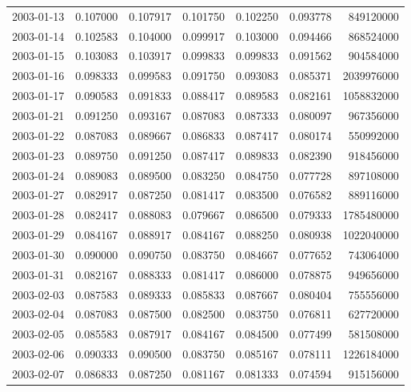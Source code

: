 \begin{tabular}{lrrrrrr}
2003-01-13 &    0.107000 &    0.107917 &    0.101750 &    0.102250 &    0.093778 &   849120000 \\
2003-01-14 &    0.102583 &    0.104000 &    0.099917 &    0.103000 &    0.094466 &   868524000 \\
2003-01-15 &    0.103083 &    0.103917 &    0.099833 &    0.099833 &    0.091562 &   904584000 \\
2003-01-16 &    0.098333 &    0.099583 &    0.091750 &    0.093083 &    0.085371 &  2039976000 \\
2003-01-17 &    0.090583 &    0.091833 &    0.088417 &    0.089583 &    0.082161 &  1058832000 \\
2003-01-21 &    0.091250 &    0.093167 &    0.087083 &    0.087333 &    0.080097 &   967356000 \\
2003-01-22 &    0.087083 &    0.089667 &    0.086833 &    0.087417 &    0.080174 &   550992000 \\
2003-01-23 &    0.089750 &    0.091250 &    0.087417 &    0.089833 &    0.082390 &   918456000 \\
2003-01-24 &    0.089083 &    0.089500 &    0.083250 &    0.084750 &    0.077728 &   897108000 \\
2003-01-27 &    0.082917 &    0.087250 &    0.081417 &    0.083500 &    0.076582 &   889116000 \\
2003-01-28 &    0.082417 &    0.088083 &    0.079667 &    0.086500 &    0.079333 &  1785480000 \\
2003-01-29 &    0.084167 &    0.088917 &    0.084167 &    0.088250 &    0.080938 &  1022040000 \\
2003-01-30 &    0.090000 &    0.090750 &    0.083750 &    0.084667 &    0.077652 &   743064000 \\
2003-01-31 &    0.082167 &    0.088333 &    0.081417 &    0.086000 &    0.078875 &   949656000 \\
2003-02-03 &    0.087583 &    0.089333 &    0.085833 &    0.087667 &    0.080404 &   755556000 \\
2003-02-04 &    0.087083 &    0.087500 &    0.082500 &    0.083750 &    0.076811 &   627720000 \\
2003-02-05 &    0.085583 &    0.087917 &    0.084167 &    0.084500 &    0.077499 &   581508000 \\
2003-02-06 &    0.090333 &    0.090500 &    0.083750 &    0.085167 &    0.078111 &  1226184000 \\
2003-02-07 &    0.086833 &    0.087250 &    0.081167 &    0.081333 &    0.074594 &   915156000 \\

\end{tabular}
